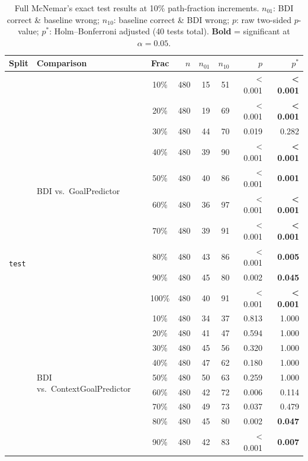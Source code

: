 \begin{table}[t]
  \centering
  \scriptsize
  \setlength{\tabcolsep}{3pt}
  \caption{Full McNemar's exact test results at 10\% path-fraction increments.  $n_{01}$: BDI correct \& baseline wrong; $n_{10}$: baseline correct \& BDI wrong; $p$: raw two-sided $p$-value; $p^*$: Holm--Bonferroni adjusted (40 tests total).  \textbf{Bold} = significant at $\alpha=0.05$.}
  \label{tab:mcnemar_full}
  \begin{tabular}{llcrrrrr}
    \toprule
    Split & Comparison & Frac & $n$ & $n_{01}$ & $n_{10}$ & $p$ & $p^*$ \\
    \midrule
    \multirow{20}{*}{\texttt{test}} & \multirow{10}{*}{BDI vs.\ GoalPredictor} & 10\% & 480 & 15 & 51 & < 0.001 & \textbf{< 0.001} \\
     &  & 20\% & 480 & 19 & 69 & < 0.001 & \textbf{< 0.001} \\
     &  & 30\% & 480 & 44 & 70 & 0.019 & 0.282 \\
     &  & 40\% & 480 & 39 & 90 & < 0.001 & \textbf{< 0.001} \\
     &  & 50\% & 480 & 40 & 86 & < 0.001 & \textbf{0.001} \\
     &  & 60\% & 480 & 36 & 97 & < 0.001 & \textbf{< 0.001} \\
     &  & 70\% & 480 & 39 & 91 & < 0.001 & \textbf{< 0.001} \\
     &  & 80\% & 480 & 43 & 86 & < 0.001 & \textbf{0.005} \\
     &  & 90\% & 480 & 45 & 80 & 0.002 & \textbf{0.045} \\
     &  & 100\% & 480 & 40 & 91 & < 0.001 & \textbf{< 0.001} \\
    \cmidrule(l){2-8}
     & \multirow{10}{*}{BDI vs.\ ContextGoalPredictor} & 10\% & 480 & 34 & 37 & 0.813 & 1.000 \\
     &  & 20\% & 480 & 41 & 47 & 0.594 & 1.000 \\
     &  & 30\% & 480 & 45 & 56 & 0.320 & 1.000 \\
     &  & 40\% & 480 & 47 & 62 & 0.180 & 1.000 \\
     &  & 50\% & 480 & 50 & 63 & 0.259 & 1.000 \\
     &  & 60\% & 480 & 42 & 72 & 0.006 & 0.114 \\
     &  & 70\% & 480 & 49 & 73 & 0.037 & 0.479 \\
     &  & 80\% & 480 & 45 & 80 & 0.002 & \textbf{0.047} \\
     &  & 90\% & 480 & 42 & 83 & < 0.001 & \textbf{0.007} \\

\end{tabular}
\end{table}
